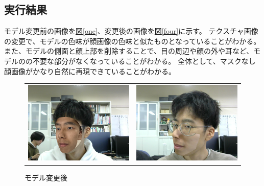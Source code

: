 \documentclass[]{jarticle}          %
\begin{document}
\subsection{実行結果}
モデル変更前の画像を\hyperref[one]{図\ref{one}}、変更後の画像を\hyperref[four]{図\ref{four}}に示す。
テクスチャ画像の変更で、モデルの色味が顔画像の色味と似たものとなっていることがわかる。
また、モデルの側面と顔上部を削除することで、目の周辺や顔の外や耳など、モデルのの不要な部分がなくなっていることがわかる。
全体として、マスクなし顔画像がかなり自然に再現できていることがわかる。
\begin{figure}[!ht]
  \begin{tabular}{cc}
    \begin{minipage}[t]{0.45\hsize}
      \centering
      \includegraphics[keepaspectratio, scale=0.2]{figures/1.png}
      \caption{モデル変更前}
      \label{one}
    \end{minipage} &
    \begin{minipage}[t]{0.45\hsize}
      \centering
      \includegraphics[keepaspectratio, scale=0.2]{figures/2.png}
      \caption{モデル変更後}
      \label{two}
    \end{minipage}
  \end{tabular}
\end{figure}
\end{document}
